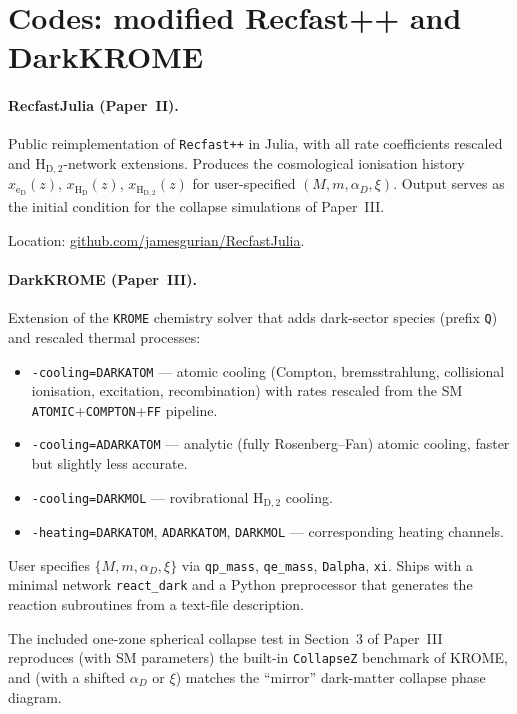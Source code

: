 \documentclass[12pt]{article}
\newcommand{\HD}{\mathrm{H_D}}
\newcommand{\HDtwo}{\mathrm{H_{D,2}}}
\newcommand{\eD}{\mathrm{e_D}}
\newcommand{\alphaD}{\alpha_D}
\begin{document}
\section{Codes: modified Recfast++ and DarkKROME}
\label{sec:codes}

\paragraph{RecfastJulia (Paper~II).}
Public reimplementation of \texttt{Recfast++} in Julia, with all rate
coefficients rescaled and $\HDtwo$-network extensions.  Produces the
cosmological ionisation history $x_{\eD}(z)$, $x_{\HD}(z)$,
$x_{\HDtwo}(z)$ for user-specified $(M, m, \alphaD, \xi)$.  Output
serves as the initial condition for the collapse simulations of
Paper~III.

Location:
\href{https://github.com/jamesgurian/RecfastJulia}{github.com/jamesgurian/RecfastJulia}.

\paragraph{DarkKROME (Paper~III).}
Extension of the \texttt{KROME} chemistry solver \citep{Grassi2014}
that adds dark-sector species (prefix \texttt{Q}) and rescaled thermal
processes:
%
\begin{itemize}
  \item \texttt{-cooling=DARKATOM} --- atomic cooling
        (Compton, bremsstrahlung, collisional ionisation, excitation,
        recombination) with rates rescaled from the SM
        \texttt{ATOMIC}+\texttt{COMPTON}+\texttt{FF} pipeline.
  \item \texttt{-cooling=ADARKATOM} --- analytic (fully Rosenberg--Fan)
        atomic cooling, faster but slightly less accurate.
  \item \texttt{-cooling=DARKMOL} --- rovibrational $\HDtwo$ cooling.
  \item \texttt{-heating=DARKATOM}, \texttt{ADARKATOM},
        \texttt{DARKMOL} --- corresponding heating channels.
\end{itemize}
%
User specifies $\{M, m, \alphaD, \xi\}$ via \texttt{qp\_mass},
\texttt{qe\_mass}, \texttt{Dalpha}, \texttt{xi}.  Ships with a minimal
network \texttt{react\_dark} and a Python preprocessor that generates
the reaction subroutines from a text-file description.

The included one-zone spherical collapse test in Section~3 of
Paper~III reproduces (with SM parameters) the built-in
\texttt{CollapseZ} benchmark of KROME, and (with a shifted $\alphaD$
or $\xi$) matches the \citet{DAmico2018} ``mirror'' dark-matter
collapse phase diagram.
\end{document}
